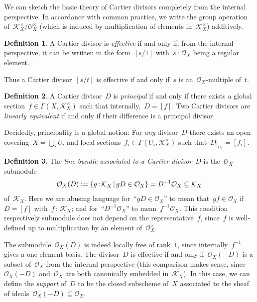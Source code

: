 \documentclass[10pt,reqno,a4paper]{amsbook}
\theoremstyle{definition}
\newtheorem{defn}{Definition}[section]
\theoremstyle{plain}
\theoremstyle{remark}
\renewcommand{\O}{\mathcal{O}}
\newcommand{\K}{\mathcal{K}}
\newcommand{\?}{\,{:}\,}
\renewcommand{\_}{\mathpunct{.}\,}
\newcommand{\defeq}{\vcentcolon=}
\begin{document}
We can sketch the basic theory of Cartier divisors completely from the internal
perspective. In accordance with common practice, we write the group
operation of~$\K_X^\times/\O_X^\times$ (which is induced by multiplication of elements
in~$\K_X^\times$) additively.

\begin{defn}\label{defn:effective-cartier-divisor}
A Cartier divisor is \emph{effective} if and only if, from the
internal perspective, it can be written in the form~$[s/1]$ with~$s\?\O_X$
being a regular element.\end{defn}

Thus a Cartier divisor~$[s/t]$ is effective if and only if~$s$ is
an~$\O_X$-multiple of~$t$.

\begin{defn}A Cartier divisor~$D$ is \emph{principal} if and only if there
exists a global section~$f \in \Gamma(X,\K_X^\times)$ such that internally,~$D = [f]$.
Two Cartier divisors are \emph{linearly equivalent} if and only if their
difference is a principal divisor.
\end{defn}

Decidedly, principality is a global notion: For \emph{any} divisor~$D$
there exists an open covering~$X = \bigcup_i U_i$ and local sections~$f_i \in
\Gamma(U_i, \K_X^\times)$ such that~$D|_{U_i} = [f_i]$.

\begin{defn}\label{defn:line-bundle-of-divisor}
The \emph{line bundle associated to a Cartier divisor}~$D$
is the~$\O_X$-submodule
\[ \O_X(D) \defeq \{ g \? \K_X \,|\, g D \in \O_X \} = D^{-1} \O_X \subseteq \K_X
\]
of~$\K_X$. Here we are abusing language for~``$gD \in \O_X$'' to mean that~$gf
\in \O_X$ if~$D = [f]$ with~$f\?\K_X$; and for~``$D^{-1} \O_X$'' to
mean~$f^{-1}\O_X$. This condition respectively submodule does not depend on the
representative~$f$, since~$f$ is well-defined up to multiplication by an element
of~$\O_X^\times$.\end{defn}

The submodule~$\O_X(D)$ is indeed locally free of rank~$1$, since
internally~$f^{-1}$ gives a one-element basis. The divisor~$D$ is effective if
and only if~$\O_X(-D)$ is a subset of~$\O_X$ from the internal perspective
(this comparison makes sense, since~$\O_X(-D)$ and~$\O_X$ are both canonically
embedded in~$\K_X$). In
this case, we can define the \emph{support} of~$D$ to be the closed subscheme
of~$X$ associated to the sheaf of ideals~$\O_X(-D) \subseteq \O_X$.
\end{document}
